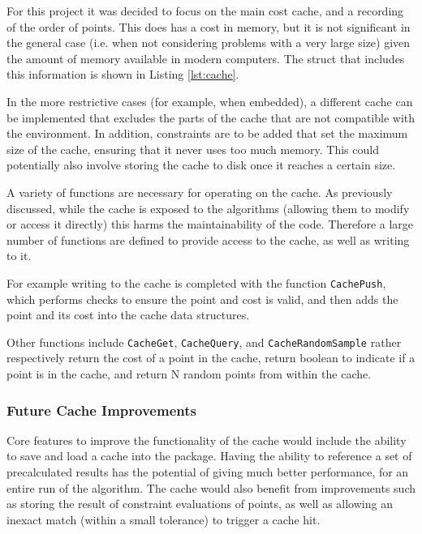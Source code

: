 For this project it was decided to focus on the main cost cache, and a recording of the order of points. This does has a cost in memory, but it is not significant in the general case (i.e. when not considering problems with a very large size) given the amount of memory available in modern computers. The struct that includes this information is shown in Listing \ref{lst:cache}.

In the more restrictive cases (for example, when embedded), a different cache can be implemented that excludes the parts of the cache that are not compatible with the environment. In addition, constraints are to be added that set the maximum size of the cache, ensuring that it never uses too much memory. This could potentially also involve storing the cache to disk once it reaches a certain size. 

A variety of functions are necessary for operating on the cache. As previously discussed, while the cache is exposed to the algorithms (allowing them to modify or access it directly) this harms the maintainability of the code. Therefore a large number of functions are defined to provide access to the cache, as well as writing to it. 

For example writing to the cache is completed with the function \texttt{CachePush}, which performs checks to ensure the point and cost is valid, and then adds the point and its cost into the cache data structures.

\begin{figure}[t]
    
\end{figure}

Other functions include \texttt{CacheGet}, \texttt{CacheQuery}, and \texttt{CacheRandomSample} rather respectively return the cost of a point in the cache, return boolean to indicate if a point is in the cache, and return N random points from within the cache.

\subsubsection{Future Cache Improvements}

Core features to improve the functionality of the cache would include the ability to save and load a cache into the package. Having the ability to reference a set of precalculated results has the potential of giving much better performance, for an entire run of the algorithm. The cache would also benefit from improvements such as storing the result of constraint evaluations of points, as well as allowing an inexact match (within a small tolerance) to trigger a cache hit.


